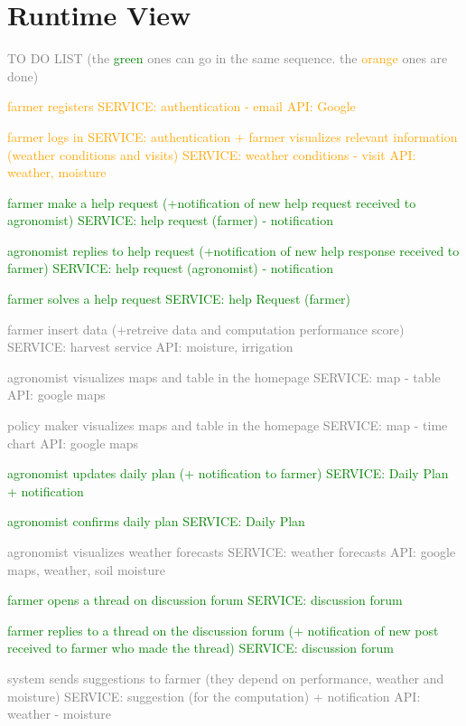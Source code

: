 \section{Runtime View}


\textcolor{gray}{TO DO LIST (the \textcolor{green} {green} ones can go in the same sequence. the \textcolor{orange}{orange} ones are done)
\begin{enumerate}
    \item \textcolor{orange}{farmer registers SERVICE: authentication - email API: Google}
    \item \textcolor{orange}{farmer logs in SERVICE: authentication + farmer visualizes relevant information (weather conditions and visits) SERVICE: weather conditions - visit API: weather, moisture}
    \textcolor{green}{
    \item farmer make a help request (+notification of new help request received to agronomist) SERVICE: help request (farmer) - notification
    \item agronomist replies to help request (+notification of new help response received to farmer) SERVICE: help request (agronomist) - notification
    \item farmer solves a help request SERVICE: help Request (farmer)}
    \item farmer insert data (+retreive data and computation performance score) SERVICE: harvest service API: moisture, irrigation
    \item agronomist visualizes maps and table in the homepage SERVICE: map - table API: google maps
    \item policy maker visualizes maps and table in the homepage SERVICE: map - time chart API: google maps
    \textcolor{green}{
    \item agronomist updates daily plan (+ notification to farmer) SERVICE: Daily Plan + notification
    \item agronomist confirms daily plan SERVICE: Daily Plan }
    \item agronomist visualizes weather forecasts SERVICE: weather forecasts API: google maps, weather, soil moisture 
    \textcolor{green}{
    \item farmer opens a thread on discussion forum SERVICE: discussion forum
    \item farmer replies to a thread on the discussion forum (+ notification of new post received to farmer who made the thread) SERVICE: discussion forum}
    \item system sends suggestions to farmer (they depend on performance, weather and moisture) SERVICE: suggestion (for the computation) + notification API: weather - moisture
\end{enumerate}
}

